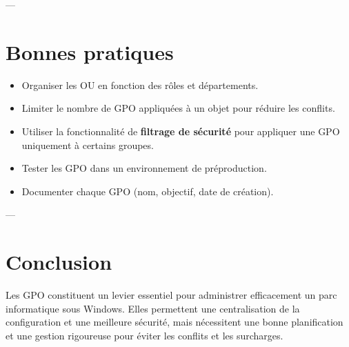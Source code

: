 \documentclass[a4paper,12pt]{article}
\begin{document}
---

\section{Bonnes pratiques}
\begin{tcolorbox}[colback=gray!5!white,colframe=gray!70!black,title=Recommandations d’administration]
\begin{itemize}
  \item Organiser les OU en fonction des rôles et départements.
  \item Limiter le nombre de GPO appliquées à un objet pour réduire les conflits.
  \item Utiliser la fonctionnalité de \textbf{filtrage de sécurité} pour appliquer une GPO uniquement à certains groupes.
  \item Tester les GPO dans un environnement de préproduction.
  \item Documenter chaque GPO (nom, objectif, date de création).
\end{itemize}
\end{tcolorbox}

---

\section*{Conclusion}
\begin{tcolorbox}[colback=blue!5!white,colframe=blue!75!black,title=Résumé]
Les GPO constituent un levier essentiel pour administrer efficacement un parc informatique sous Windows. Elles permettent une centralisation de la configuration et une meilleure sécurité, mais nécessitent une bonne planification et une gestion rigoureuse pour éviter les conflits et les surcharges.
\end{tcolorbox}
\end{document}
